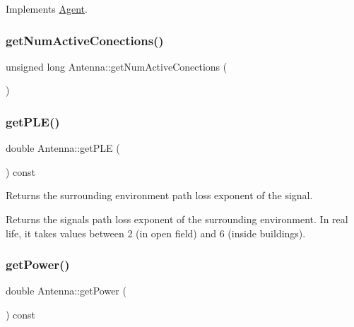 Implements \mbox{\hyperlink{class_agent_afe6c72d91baf9ee4fe77ea1ed7fef3ba}{Agent}}.

\mbox{\label{class_antenna_a86c5c094ab6ea432609afa00f3a8080a}} 
\subsubsection{\texorpdfstring{getNumActiveConections()}{getNumActiveConections()}}
{\footnotesize\ttfamily unsigned long Antenna\+::get\+Num\+Active\+Conections (\begin{DoxyParamCaption}{ }\end{DoxyParamCaption})\hspace{0.3cm}{\ttfamily [private]}}

\mbox{\label{class_antenna_ab0c45eb94291446fc48c312854f8818d}} 
\subsubsection{\texorpdfstring{getPLE()}{getPLE()}}
{\footnotesize\ttfamily double Antenna\+::get\+P\+LE (\begin{DoxyParamCaption}{ }\end{DoxyParamCaption}) const}

Returns the surrounding environment\textquotesingle{} path loss exponent of the signal. \begin{DoxyReturn}{Returns}
the signals\textquotesingle{} path loss exponent of the surrounding environment. In real life, it takes values between 2 (in open field) and 6 (inside buildings). 
\end{DoxyReturn}
\mbox{\label{class_antenna_afca01d00c8e393ee911f1e9240b51d2e}} 
\subsubsection{\texorpdfstring{getPower()}{getPower()}}
{\footnotesize\ttfamily double Antenna\+::get\+Power (\begin{DoxyParamCaption}{ }\end{DoxyParamCaption}) const}

